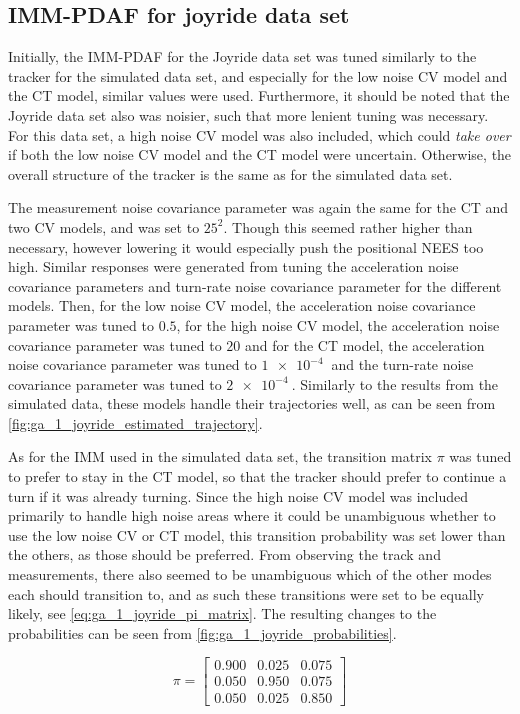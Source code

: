 \subsection{IMM-PDAF for joyride data set}
Initially, the IMM-PDAF for the Joyride data set was tuned similarly to the tracker for the simulated data set, and especially for the low noise CV model and the CT model, similar values were used. Furthermore, it should be noted that the Joyride data set also was noisier, such that more lenient tuning was necessary. For this data set, a high noise CV model was also included, which could \textit{take over} if both the low noise CV model and the CT model were uncertain. Otherwise, the overall structure of the tracker is the same as for the simulated data set. 

The measurement noise covariance parameter was again the same for the CT and two CV models, and was set to $25^2$. Though this seemed rather higher than necessary, however lowering it would especially push the positional NEES too high. Similar responses were generated from tuning the acceleration noise covariance parameters and turn-rate noise covariance parameter for the different models. Then, for the low noise CV model, the acceleration noise covariance parameter was tuned to $0.5$, for the high noise CV model, the acceleration noise covariance parameter was tuned to $20$ and for the CT model, the acceleration noise covariance parameter was tuned to $\SI{1e-4}{}$ and the turn-rate noise covariance parameter was tuned to $\SI{2e-4}{}$. Similarly to the results from the simulated data, these models handle their trajectories well, as can be seen from \cref{fig:ga_1_joyride_estimated_trajectory}. 

As for the IMM used in the simulated data set, the transition matrix $\pi$ was tuned to prefer to stay in the CT model, so that the tracker should prefer to continue a turn if it was already turning. Since the high noise CV model was included primarily to handle high noise areas where it could be unambiguous whether to use the low noise CV or CT model, this transition probability was set lower than the others, as those should be preferred. From observing the track and measurements, there also seemed to be unambiguous which of the other modes each should transition to, and as such these transitions were set to be equally likely, see \cref{eq:ga_1_joyride_pi_matrix}. The resulting changes to the probabilities can be seen from \cref{fig:ga_1_joyride_probabilities}. 

\begin{equation}
    \label{eq:ga_1_joyride_pi_matrix}
    \pi = \begin{bmatrix}
        0.900 & 0.025 & 0.075 \\
        0.050 & 0.950 & 0.075 \\
        0.050 & 0.025 & 0.850 
    \end{bmatrix}
\end{equation}

